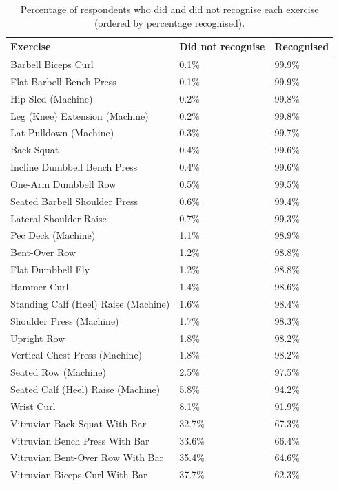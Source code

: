 \documentclass[
]{article}
\begin{document}
\begin{longtable}[t]{lll}

\caption{\label{tbl-recognise}Percentage of respondents who did and did
not recognise each exercise (ordered by percentage recognised).}

\tabularnewline

\toprule
Exercise & Did not recognise & Recognised\\
\midrule
Barbell Biceps Curl & 0.1\% & 99.9\%\\
Flat Barbell Bench Press & 0.1\% & 99.9\%\\
Hip Sled (Machine) & 0.2\% & 99.8\%\\
Leg (Knee) Extension (Machine) & 0.2\% & 99.8\%\\
Lat Pulldown (Machine) & 0.3\% & 99.7\%\\
\addlinespace
Back Squat & 0.4\% & 99.6\%\\
Incline Dumbbell Bench Press & 0.4\% & 99.6\%\\
One-Arm Dumbbell Row & 0.5\% & 99.5\%\\
Seated Barbell Shoulder Press & 0.6\% & 99.4\%\\
Lateral Shoulder Raise & 0.7\% & 99.3\%\\
\addlinespace
Pec Deck (Machine) & 1.1\% & 98.9\%\\
Bent-Over Row & 1.2\% & 98.8\%\\
Flat Dumbbell Fly & 1.2\% & 98.8\%\\
Hammer Curl & 1.4\% & 98.6\%\\
Standing Calf (Heel) Raise (Machine) & 1.6\% & 98.4\%\\
\addlinespace
Shoulder Press (Machine) & 1.7\% & 98.3\%\\
Upright Row & 1.8\% & 98.2\%\\
Vertical Chest Press (Machine) & 1.8\% & 98.2\%\\
Seated Row (Machine) & 2.5\% & 97.5\%\\
Seated Calf (Heel) Raise (Machine) & 5.8\% & 94.2\%\\
\addlinespace
Wrist Curl & 8.1\% & 91.9\%\\
Vitruvian Back Squat With Bar & 32.7\% & 67.3\%\\
Vitruvian Bench Press With Bar & 33.6\% & 66.4\%\\
Vitruvian Bent-Over Row With Bar & 35.4\% & 64.6\%\\
Vitruvian Biceps Curl With Bar & 37.7\% & 62.3\%\\
\bottomrule

\end{longtable}
\end{document}
